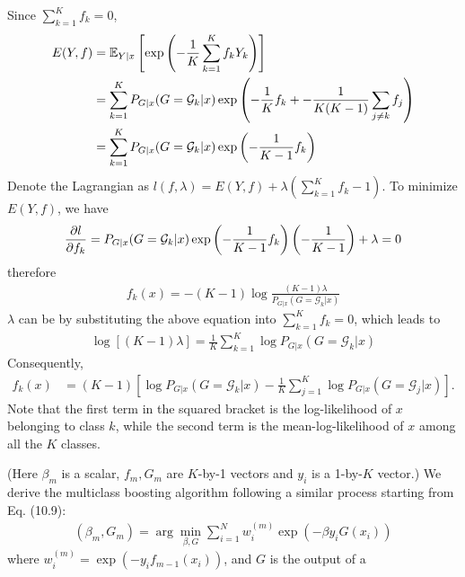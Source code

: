 \begin{exercise}
  \begin{exerciseSection}
    Since $\sum_{k=1}^Kf_k =0$,
    \begin{align}
      E(Y,f) &= \mathbb{E}_{Y|x}\left[\exp\left(-\frac{1}{K}\sum_{k=1}^Kf_kY_k
       \right) \right] \notag\\
       &= \sum_{k=1}^K P_{G|x}(G=\mathcal{G}_k|x) \exp\left(-\frac{1}{K}f_k +
       -\frac{1}{K(K-1)}\sum_{j\not=k}f_j \right) \notag\\
       &= \sum_{k=1}^K P_{G|x}(G=\mathcal{G}_k|x) \exp\left(-\frac{1}{K-1}f_k \right)
    \end{align}
    Denote the Lagrangian as $l(f, \lambda) =  E(Y,f) +
    \lambda(\sum_{k=1}^Kf_k - 1)$. To minimize $E(Y,f)$, we have
    \begin{align}
      \pdv{l}{f_k} = P_{G|x}(G=\mathcal{G}_k|x) \exp\left(-\frac{1}{K-1}f_k
      \right)\left(-\frac{1}{K-1}\right) + \lambda = 0
    \end{align} 
    therefore
    \begin{align}
      f_k(x) = -(K-1)\log\frac{(K-1)\lambda}{P_{G|x}(G=\mathcal{G}_k|x)}
    \end{align}
    $\lambda$ can be by substituting the above equation into $\sum_{k=1}^Kf_k
    =0$, which leads to
    \begin{align}
      \log[(K-1)\lambda] = \frac{1}{K}\sum_{k=1}^K\log
      P_{G|x}(G=\mathcal{G}_k|x)
    \end{align}
    Consequently,
    \begin{align}
      f_k(x) &= (K-1)\left[\log P_{G|x}(G=\mathcal{G}_k|x) -
      \frac{1}{K}\sum_{j=1}^K \log P_{G|x}(G=\mathcal{G}_j|x) \right].
    \end{align}
    Note that the first term in the squared bracket is the log-likelihood of
    $x$ belonging to class $k$, while the second term is the mean-log-likelihood
    of $x$ among all the $K$ classes.
  \end{exerciseSection}
  \begin{exerciseSection}
    (Here $\beta_m$ is a scalar, $f_m, G_m$ are $K$-by-1 vectors and $y_i$ is a
    1-by-$K$ vector.) We derive the multiclass boosting algorithm following
    a similar process starting from Eq. (10.9):
    \begin{align}
      (\beta_m, G_m) = \arg\min_{\beta, G}\sum_{i=1}^Nw_i^{(m)}\exp(-\beta
      y_iG(x_i))
    \end{align}
    where $w_i^{(m)} = \exp(-y_if_{m-1}(x_i))$, and $G$ is the output of a

\end{exerciseSection}
\end{exercise}
